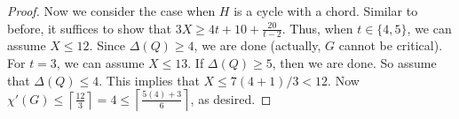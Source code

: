\documentclass[12pt]{amsart}
\theoremstyle{plain}
\newtheorem{lem}[thm]{Lemma}
\theoremstyle{definition}
\theoremstyle{remark}
\newcommand{\ceil}[1]{\left\lceil#1\right\rceil}
\begin{document}
\begin{proof}
Now we consider the case when $H$ is a cycle with a chord.  Similar to before, it
suffices to show that $3X\ge 4t+10+\frac{20}{t-2}$.  Thus, when $t\in\{4,5\}$, we can
assume $X\le 12$.  Since $\Delta(Q)\ge 4$, we are done (actually, $G$ cannot be
critical).  For $t=3$, we can assume $X\le 13$.  If $\Delta(Q)\ge 5$, then we
are done.  So assume that $\Delta(Q)\le 4$.  This implies that $X\le
7(4+1)/3<12$.  Now $\chi'(G)\le \ceil{\frac{12}3}=4\le \ceil{\frac{5(4)+3}6}$,
as desired.
\end{proof}

%
\end{document}
